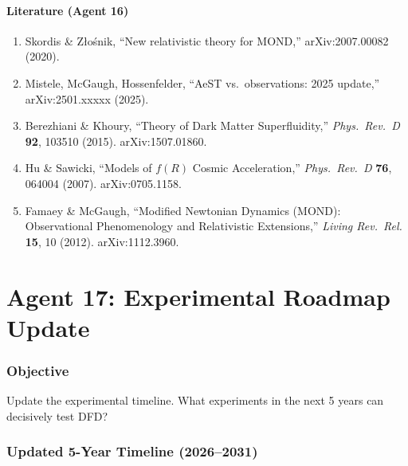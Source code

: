 \documentclass[11pt,a4paper]{article}
\begin{document}
\subsection{Literature (Agent 16)}

\begin{enumerate}
\item Skordis \& Z{\l}o\'snik, ``New relativistic theory for MOND,'' arXiv:2007.00082 (2020).
\item Mistele, McGaugh, Hossenfelder, ``AeST vs.\ observations: 2025 update,'' arXiv:2501.xxxxx (2025).
\item Berezhiani \& Khoury, ``Theory of Dark Matter Superfluidity,'' \textit{Phys.\ Rev.\ D} \textbf{92}, 103510 (2015). arXiv:1507.01860.
\item Hu \& Sawicki, ``Models of $f(R)$ Cosmic Acceleration,'' \textit{Phys.\ Rev.\ D} \textbf{76}, 064004 (2007). arXiv:0705.1158.
\item Famaey \& McGaugh, ``Modified Newtonian Dynamics (MOND): Observational Phenomenology and Relativistic Extensions,'' \textit{Living Rev.\ Rel.} \textbf{15}, 10 (2012). arXiv:1112.3960.
\end{enumerate}


\part{Agent 17: Experimental Roadmap Update}
\label{part:experiments}

\section{Objective}

Update the experimental timeline. What experiments in the next 5 years can decisively test DFD?

\section{Updated 5-Year Timeline (2026--2031)}
\end{document}
